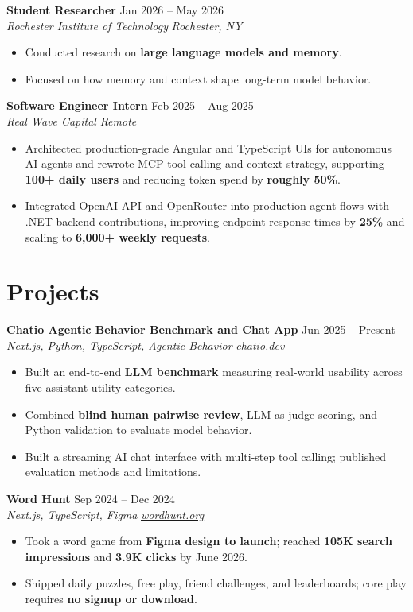 \documentclass[10pt,letterpaper]{article}
\newif\ifresumeFirstRole
\newcommand{\resumeRole}[4]{%
  \ifresumeFirstRole
    \global\resumeFirstRolefalse
  \else
    \vspace{0pt plus 1fill}%
  \fi
  \textbf{#1} \hfill #2\\
  \textit{#3} \hfill \textit{#4}
}
\begin{document}
\resumeRole{Student Researcher}{Jan 2026 -- May 2026}{Rochester Institute of Technology}{Rochester, NY}
\begin{itemize}
  \item Conducted research on \textbf{large language models and memory}.
  \item Focused on how memory and context shape long-term model behavior.
\end{itemize}

\resumeRole{Software Engineer Intern}{Feb 2025 -- Aug 2025}{Real Wave Capital}{Remote}
\begin{itemize}
  \item Architected production-grade Angular and TypeScript UIs for autonomous AI agents and rewrote MCP tool-calling and context strategy, supporting \textbf{100+ daily users} and reducing token spend by \textbf{roughly 50\%}.
  \item Integrated OpenAI API and OpenRouter into production agent flows with .NET backend contributions, improving endpoint response times by \textbf{25\%} and scaling to \textbf{6,000+ weekly requests}.
\end{itemize}

\section*{Projects}
\resumeRole{Chatio Agentic Behavior Benchmark and Chat App}{Jun 2025 -- Present}{Next.js, Python, TypeScript, Agentic Behavior}{\href{https://chatio.dev}{chatio.dev}}
\begin{itemize}
  \item Built an end-to-end \textbf{LLM benchmark} measuring real-world usability across five assistant-utility categories.
  \item Combined \textbf{blind human pairwise review}, LLM-as-judge scoring, and Python validation to evaluate model behavior.
  \item Built a streaming AI chat interface with multi-step tool calling; published evaluation methods and limitations.
\end{itemize}

\resumeRole{Word Hunt}{Sep 2024 -- Dec 2024}{Next.js, TypeScript, Figma}{\href{https://wordhunt.org}{wordhunt.org}}
\begin{itemize}
  \item Took a word game from \textbf{Figma design to launch}; reached \textbf{105K search impressions} and \textbf{3.9K clicks} by June 2026.
  \item Shipped daily puzzles, free play, friend challenges, and leaderboards; core play requires \textbf{no signup or download}.
\end{itemize}
\end{document}
